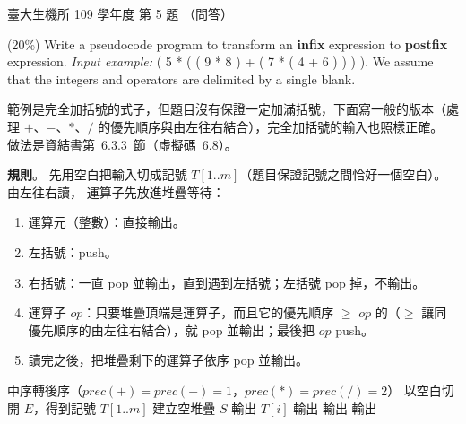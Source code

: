 \begin{pastexam}[label={px:ntu-109-bime-ds-05}]{臺大生機所 109 學年度 第 5 題}
（問答）

(20\%) Write a pseudocode program to transform an \textbf{infix} expression to \textbf{postfix}
expression. \textit{Input example:} ( 5 * ( ( 9 * 8 ) + ( 7 * ( 4 + 6 ) ) ) ). We assume that the
integers and operators are delimited by a single blank.
\end{pastexam}

\begin{pastsoln}
範例是完全加括號的式子，但題目沒有保證一定加滿括號，下面寫一般的版本（處理 $+$、$-$、$*$、$/$
的優先順序與由左往右結合），完全加括號的輸入也照樣正確。 做法是資結書第~6.3.3~節（虛擬碼~6.8）。

\textbf{規則}。 先用空白把輸入切成記號 $T[1..m]$（題目保證記號之間恰好一個空白）。 由左往右讀，
運算子先放進堆疊等待：
\begin{enumerate}
\item 運算元（整數）：直接輸出。
\item 左括號：push。
\item 右括號：一直 pop 並輸出，直到遇到左括號；左括號 pop 掉，不輸出。
\item 運算子 $\mathit{op}$：只要堆疊頂端是運算子，而且它的優先順序 $\ge$ $\mathit{op}$ 的（$\ge$ 讓同
優先順序的由左往右結合），就 pop 並輸出；最後把 $\mathit{op}$ push。
\item 讀完之後，把堆疊剩下的運算子依序 pop 並輸出。
\end{enumerate}

\begin{pseudo}{中序轉後序（$\mathit{prec}(+) = \mathit{prec}(-) = 1$，$\mathit{prec}(*) = \mathit{prec}(/) = 2$）}
    \State 以空白切開 $E$，得到記號 $T[1..m]$
    \State 建立空堆疊 $S$
            \State 輸出 $T[i]$
            \State {}
                \State 輸出 
            \EndWhile
            \State {} 
        \Else {}
                \State 輸出 
            \EndWhile
            \State {}
        \EndIf
    \EndFor
        \State 輸出 
    \EndWhile
\EndProcedure
\end{pseudo}


\end{pastsoln}

